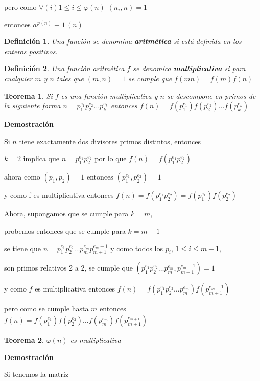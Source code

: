 \documentclass[a4paper,12pt]{report}
\newtheorem*{teo}{Teorema}
\newtheorem*{dfn}{Definición}
\begin{document}
pero como $\forall(i) 1\leq i\leq \varphi(n)$ $(n_i,n)=1$

entonces $a^{\varphi(n)}\equiv 1\, (n)$


\begin{dfn}
 Una función se denomina \textbf{aritmética} si está definida en los enteros positivos.
\end{dfn}

\begin{dfn}
 Una función aritmética  $f$ se denomica \textbf{multiplicativa} si para cualquier $m$ y $n$ tales que $(m,n)=1$ se cumple que $f(mn)=f(m)f(n)$
\end{dfn}

\begin{teo}
 Si $f$ es una función multiplicativa y $n$ se descompone en primos de la siguiente forma $n=p_1^{e_1}p_2^{e_2}\dots p_k^{e_k}$ entonces $f(n)=f(p_1^{e_1})f(p_2^{e_2})\dots f(p_k^{e_k})$ 
\end{teo}


\textbf{Demostración}

Si $n$ tiene exactamente dos divisores primos distintos, entonces 

$k=2$ implica que $n=p_1^{e_1}p_2^{e_2}$ por lo que $f(n)=f(p_1^{e_1}p_2^{e_2})$

ahora como $(p_1,p_2)=1$ entonces $(p_1^{e_1},p_2^{e_2})=1$ 

y como f es multiplicativa entonces $f(n)=f(p_1^{e_1}p_2^{e_2})=f(p_1^{e_1})f(p_2^{e_2})$


Ahora, supongamos que se cumple para $k=m$, 

probemos entonces que se cumple para $k=m+1$

se tiene que $n=p_1^{e_1}p_2^{e_2}\dots p_{m}^{e_m}p_{m+1}^{e_m+1}$ y como todos los $p_i$, $1\leq i \leq m+1$, 

son primos relativos 2 a 2, se cumple que $(p_1^{e_1}p_2^{e_2}\dots p_{m}^{e_m},p_{m+1}^{e_m+1})=1$

y como $f$ es multiplicativa entonces $f(n)=f(p_1^{e_1}p_2^{e_2}\dots p_{m}^{e_m})f(p_{m+1}^{e_m+1})$

pero como se cumple hasta $m$ entonces $f(n)=f(p_1^{e_1})f(p_2^{e_2})\dots f(p_m^{e_m})f(p_{m+1}^{e_{m+1}})$


\begin{teo}
 $\varphi(n)$ es multiplicativa
\end{teo}
\newpage

\textbf{Demostración}

Si tenemos la matriz
\end{document}
